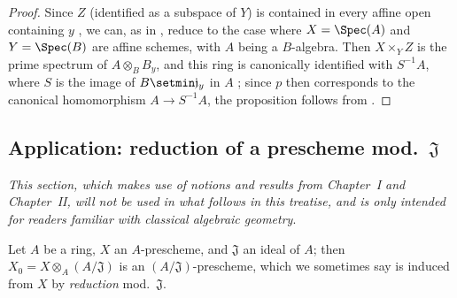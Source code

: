 \begin{proof}
Since $Z$ (identified as a subspace of $Y$) is contained in every affine open containing $y$ , we can, as in , reduce to the case where $X=\Spec(A)$ and $Y=\Spec(B)$ are affine schemes, with $A$ being a $B$-algebra.
Then $X\times_Y Z$ is the prime spectrum of $A\otimes_B B_y$, and this ring is canonically identified with $S^{-1}A$, where $S$ is the image of $B\setmin\mathfrak{j}_y$ in $A$ ; since $p$ then corresponds to the canonical homomorphism $A\to S^{-1}A$, the proposition follows from .
\end{proof}

\subsection{Application: reduction of a prescheme mod.~$\mathfrak{J}$}
\label{subsection:I.3.7}
\label{I.3.7}

\emph{This section, which makes use of notions and results from Chapter~I and Chapter~II, will not be used in what follows in this treatise, and is only intended for readers familiar with classical algebraic geometry}.

\begin{env}[3.7.1]
\label{I.3.7.1}
Let $A$ be a ring, $X$ an $A$-prescheme, and $\mathfrak{J}$ an ideal of $A$; then $X_0=X\otimes_A(A/\mathfrak{J})$ is an $(A/\mathfrak{J})$-prescheme, which we sometimes say is induced from $X$ by \emph{reduction} mod.~$\mathfrak{J}$.
\end{env}

